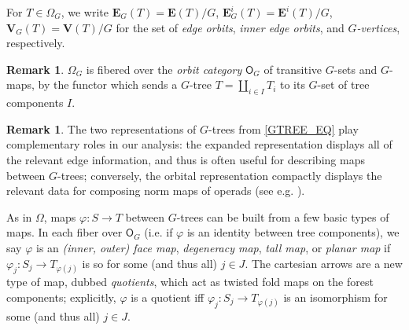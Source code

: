 \documentclass[a4paper,10pt
,draft
]{article}%
\numberwithin{equation}{section}
\numberwithin{figure}{section}
\theoremstyle{definition} %
\newtheorem{remark}[equation]{Remark}%
\newcommand{\1}{\ensuremath{\mathbbm 1}}%
\begin{document}
For $T \in \Omega_G$, we write
$\boldsymbol{E}_G(T) = \boldsymbol{E}(T)/G$, $\boldsymbol{E}^i_G(T) = \boldsymbol{E}^i(T)/G$, $\boldsymbol{V}_G(T) = \boldsymbol{V}(T)/G$
for the set of \textit{edge orbits}, \textit{inner edge orbits}, and \textit{$G$-vertices}, respectively.

\begin{remark}
      $\Omega_G$ is fibered over the \textit{orbit category} $\mathsf O_G$ of transitive $G$-sets and $G$-maps,
      by the functor which sends a $G$-tree $T = \amalg_{i \in I} T_i$ to its $G$-set of tree components $I$.
\end{remark}


\begin{remark}
      The two representations of $G$-trees from \eqref{GTREE_EQ} play complementary roles in our analysis:
      the expanded representation displays all of the relevant edge information, and thus is often useful for describing maps between $G$-trees;
      conversely, the orbital representation compactly displays the relevant data for composing norm maps of operads (see e.g. \cite[Remark 3.39]{BP_edss}).
\end{remark}

As in $\Omega$,
maps $\varphi \colon S \to T$ between $G$-trees
can be built from a few basic types of maps.
In each fiber over $\mathsf O_G$ 
(i.e. if $\varphi$ is an identity between tree components), we say $\varphi$ is an
\textit{(inner, outer) face map}, \textit{degeneracy map}, \textit{tall map}, or \textit{planar map} if
$\varphi_j \colon S_j \to T_{\varphi(j)}$ is so for some (and thus all) $j \in J$.
The cartesian arrows are a new type of map, dubbed \textit{quotients},
which act as twisted fold maps on the forest components;
explicitly, $\varphi$ is a quotient iff $\varphi_j \colon S_j \to T_{\varphi(j)}$ is an isomorphism for some (and thus all) $j \in J$.
\end{document}
